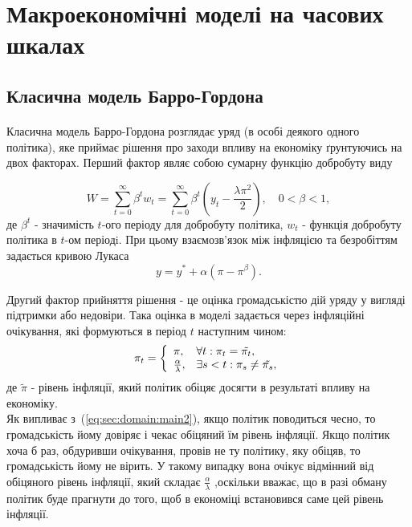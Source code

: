\section{Макроекономічні моделі на часових шкалах}
\subsection{Класична модель Барро-Гордона}
\label{sec:domain}

\paragraph{} Класична модель Барро-Гордона розглядає уряд (в особі деякого одного політика), яке приймає рішення про заходи впливу на економіку ґрунтуючись на двох факторах. Перший фактор являє собою сумарну функцію добробуту виду

\begin{equation}
 \label{eq:sec:domain:main}
W=\sum_{t=0}^{\infty}\beta^t w_t = \sum_{t=0}^{\infty}\beta^t\left(y_t-\frac{\lambda\pi^2}{2}\right), \quad 0<\beta<1,
\end{equation}
де $\beta^t$ - значимість $t$-ого періоду для добробуту політика, $w_t$ - функція добробуту політика в $t$-ом періодi. При цьому взаємозв'язок між інфляцією та безробіттям задається кривою Лукаса\\
\begin{equation}
	\label{eq:sec:domain:main1}
	y=y^*+\alpha(\pi-\pi^\beta).
\end{equation}

Другий фактор прийняття рішення - це оцінка громадськістю дій уряду у вигляді підтримки або недовіри. Така оцінка в моделі задається через інфляційні очікування, які формуються в період $ t $ наступним чином:
\begin{equation}
\label{eq:sec:domain:main2}
\pi_t = \left\{  \begin{array}{l l}
{\pi}, & \forall t:\pi_t=\tilde{\pi_t}, \\ 
\frac{\alpha}{\lambda}, & \exists s < t : \pi_s \ne \tilde{\pi_s},
\end{array} \right. 
\end{equation}
де $\tilde{\pi}$ - рівень інфляції, який політик обіцяє досягти в результаті впливу на економіку.
\\

Як випливає з~(\ref{eq:sec:domain:main2}), якщо політик поводиться чесно, то громадськість йому довіряє і чекає обіцяний їм рівень інфляції. Якщо політик хоча б раз, обдуривши очікування, провів не ту політику, яку обіцяв, то громадськість йому не вірить. У такому випадку вона очікує відмінний від обіцяного рівень інфляції, який складає	 $\frac{\alpha}{\lambda}$ ,оскільки вважає, що в разі обману політик буде прагнути до того, щоб в економіці встановився саме цей рівень інфляції.
\\

